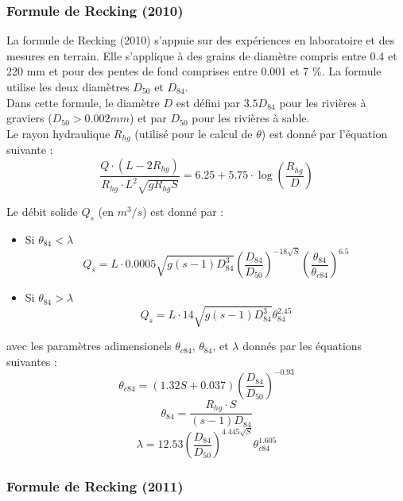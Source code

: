\documentclass[a4paper,10pt]{article}
\begin{document}
\subsubsection{Formule de Recking (2010)}

\noindent
La formule de Recking (2010) s'appuie sur des exp\'eriences en laboratoire et des mesures en terrain. Elle s'applique \`a des grains de diam\`etre compris entre 0.4 et 220 mm et pour des pentes de fond comprises entre 0.001 et 7 \%. La formule utilise les deux diam\`etres $D_{50}$ et $D_{84}$. \\

\noindent
Dans cette formule, le diam\`etre $D$ est d\'efini par $3.5 D_{84}$ pour les rivi\`eres \`a graviers ($ D_{50} > 0.002 mm$) et par $D_{50} $ pour les rivi\`eres \`a sable. \\

\noindent
Le rayon hydraulique $R_{hg}$ (utilis\'e pour le calcul de $\theta$) est donn\'e par l'\'equation suivante :
$$ \frac{Q \cdot (L - 2 R_{hg})}{R_{hg} \cdot L^2 \sqrt{g R_{hg} S}} = 6.25 + 5.75 \cdot \log \left(\frac{R_{hg}}{D}\right) $$

\noindent
Le d\'ebit solide $Q_s$ (en $m^3/s$) est donn\'e par :
\begin{itemize}
\item[] Si $ \theta_{84} < \lambda $
$$ Q_s = L \cdot 0.0005 \sqrt{g (s-1) D_{84}^3} \left(\frac{D_{84}}{D_{50}}\right)^{-18 \sqrt{S}} \left(\frac{\theta_{84}}{\theta_{c84}}\right)^{6.5} $$
\item[] Si $\theta_{84} > \lambda $
$$ Q_s = L \cdot 14 \sqrt{g (s-1) D_{84}^3} \theta_{84}^{2.45} $$ 
\end{itemize}

\noindent
avec les param\`etres adimensionels $\theta_{c84}$, $\theta_{84}$, et $\lambda$ donn\'es par les \'equations suivantes :
$$ \theta_{c84} = (1.32S + 0.037) \left(\frac{D_{84}}{D_{50}}\right)^{-0.93} $$
$$ \theta_{84} = \frac{R_{hg} \cdot S}{(s-1) D_{84}} $$  
$$ \lambda = 12.53 \left(\frac{D_{84}}{D_{50}}\right)^{4.445 \sqrt{S}} \theta_{c84}^{1.605} $$


\subsubsection{Formule de Recking (2011)}
\end{document}
